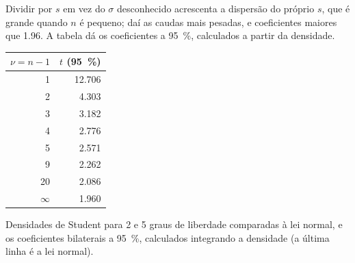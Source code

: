 \admitted

Dividir por $s$ em vez do $\sigma$ desconhecido acrescenta a dispersão do próprio $s$, que é grande
quando $n$ é pequeno; daí as caudas mais pesadas, e coeficientes maiores que 1.96. A tabela dá os
coeficientes a 95~\%, calculados a partir da densidade.

\begin{omfigure}
\begin{minipage}[c]{0.56\linewidth}
\end{minipage}\hfill
\begin{minipage}[c]{0.4\linewidth}\centering
\small
\begin{tabular}{rr}
\hline
$\nu = n - 1$ & $t$ (95~\%) \\
\hline
1 & 12.706 \\
2 & 4.303 \\
3 & 3.182 \\
4 & 2.776 \\
5 & 2.571 \\
9 & 2.262 \\
20 & 2.086 \\
$\infty$ & 1.960 \\
\hline
\end{tabular}
\end{minipage}
\par\vspace{4pt}

{\small Densidades de Student para 2 e 5 graus de liberdade comparadas à lei normal, e os coeficientes
bilaterais a 95~\%, calculados integrando a densidade (a última linha é a lei normal).}
\end{omfigure}

